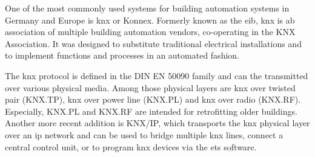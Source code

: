 One of the most commonly used systems for building automation systems in Germany and Europe is \Gls{knx} or Konnex. Formerly known as the \gls{eib}, \gls{knx} is ab association of multiple building automation vendors, co-operating in the KNX Association. %
It was designed to substitute traditional electrical installations and to implement functions and processes in an automated fashion. \parencite{Merz2009}

The \gls{knx} protocol is defined in the DIN EN 50090 family and can the transmitted over various physical media. Among those physical layers are \gls{knx} over twisted pair (KNX.TP), \gls{knx} over power line (KNX.PL) and \gls{knx} over radio (KNX.RF). Especially, KNX.PL and KNX.RF are intended for retrofitting older buildings.
Another more recent addition is KNX/IP, which transports the \gls{knx} physical layer over an \gls{ip} network and can be used to bridge multiple \gls{knx} lines, connect a central control unit, or to program \gls{knx} devices via the \gls{ets} software.
\parencite{Merz2009}

